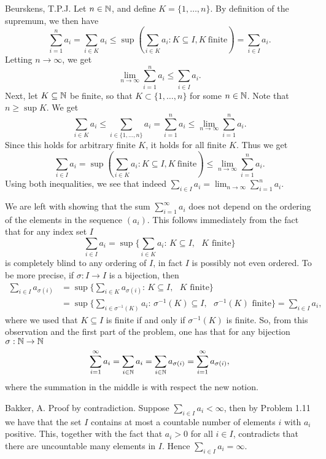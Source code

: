 \begin{solution}[1.10]{Beurskens, T.P.J.}
Let $n \in \mathbb N$, and define $K = \{1, \ldots, n\}$.
By definition of the supremum, we then have
$$\sum_{i = 1}^n a_i = \sum_{i \in K} a_i \leq \sup \left( \sum_{i \in K} a_i : K \subseteq I, K~\text{finite} \right) = \sum_{i \in I} a_i.$$
Letting $n \to \infty$, we get
\[
\lim_{n \to \infty} \sum^n_{i = 1} a_i \leq \sum_{i \in I} a_i.
\]
Next, let $K \subseteq \mathbb N$ be finite, so that $K \subset \{1, \ldots, n\}$ for some $n \in \mathbb N$.
Note that $n \geq \sup K$.
We get
\[
\sum_{i \in K} a_i \leq \sum_{i \in \{1,\ldots, n\}} a_i = \sum_{i = 1}^n  a_i \leq \lim_{n\to\infty} \sum_{i = 1}^n  a_i.
\]
Since this holds for arbitrary finite $K$, it holds for all finite $K$.
Thus we get
\[
\sum_{i \in I} a_i = \sup \left( \sum_{i \in K} a_i : K \subseteq I, K~\text{finite} \right) \leq \lim_{n\to\infty} \sum_{i = 1}^n  a_i.
\]
Using both inequalities, we see that indeed $\sum_{i \in I} a_i = \lim_{n \to \infty} \sum^n_{i = 1} a_i$. 

We are left with showing that the sum $\sum_{i = 1}^\infty a_i$ does not depend on the ordering of the elements in the sequence $(a_i)$. This follows immediately from the fact that for any index set $I$
\begin{equation*}
	\sum_{i \in I} a_i = \sup\Big\{\sum_{i\in K} a_i:\, K\subseteq I,\text{ $K$ finite}\Big\}
\end{equation*}
is completely blind to any ordering of $I$, in fact $I$ is possibly not even ordered. To be more precise, if $\sigma:I\to I$ is a bijection, then
\begin{equation*}
	\begin{aligned}
	\sum_{i \in I} a_{\sigma(i)} & =  \sup\Big\{\sum_{i\in K} a_{\sigma(i)}:\, K\subseteq I,\text{ $K$ finite}\Big\} \\ 
	& = \sup\Big\{\sum_{i\in \sigma^{-1}(K)} a_i:\, \sigma^{-1}(K)\subseteq I,\text{ $\sigma^{-1}(K)$ finite}\Big\} = \sum_{i \in I} a_{i},
	\end{aligned}
\end{equation*}
where we used that $K\subseteq I$ is finite if and only if $\sigma^{-1}(K)$ is finite.
So, from this observation and the first part of the problem, one has that for any bijection $\sigma:\mathbb N\to \mathbb N$
\begin{equation*}
	\sum^\infty_{i = 1} a_i = \sum_{i\in \mathbb N} a_i = \sum_{i\in \mathbb N} a_{\sigma(i)} = \sum_{i = 1}^\infty a_{\sigma(i)},
\end{equation*}
where the summation in the middle is with respect the new notion.
\end{solution}

\begin{solution}[1.12]{Bakker, A.}
	Proof by contradiction. Suppose $\sum_{i\in I}a_i < \infty$, then by Problem 1.11 we have that the set $I$ contains at most a countable number of elements $i$ with $a_i$ positive. This, together with the fact that $a_i>0$ for all $i\in I$, contradicts that there are uncountable many elements in $I$. Hence  $\sum_{i\in I}a_i = \infty$.
\end{solution}